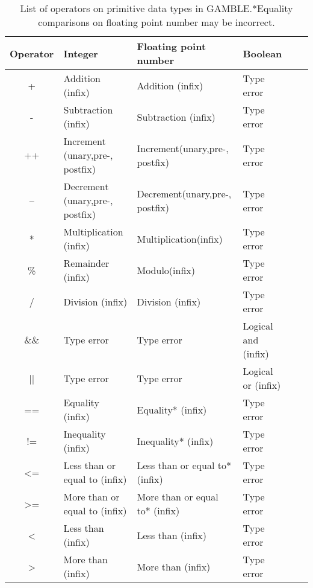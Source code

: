 \begin{table}[h]
    \centering
    \begin{tabular}{|c|l|l|l|l|l|}
    \hline
    \textbf{Operator}  & \textbf{Integer}                   & \textbf{Floating point number}    & \textbf{Boolean}       \\ \hline
    +                  & Addition (infix)                   & Addition (infix)                  & Type error             \\ \hline 
    -                  & Subtraction (infix)                & Subtraction (infix)               & Type error             \\ \hline 
    ++                 & Increment (unary,pre-, postfix)    & Increment(unary,pre-, postfix)    & Type error             \\ \hline    
    --                 & Decrement (unary,pre-, postfix)    & Decrement(unary,pre-, postfix)    & Type error             \\ \hline
    *                  & Multiplication (infix)             & Multiplication(infix)             & Type error             \\ \hline
    \%                 & Remainder (infix)                  & Modulo(infix)                     & Type error             \\ \hline
    /                  & Division (infix)                   & Division (infix)                  & Type error             \\ \hline
    \&\&               & Type error                         & Type error                        & Logical and (infix)    \\ \hline 
    ||                 & Type error                         & Type error                        & Logical or (infix)     \\ \hline 
    ==                 & Equality (infix)                   & Equality* (infix)                 & Type error             \\ \hline 
    !=                 & Inequality (infix)                 & Inequality* (infix)               & Type error             \\ \hline
    <=                 & Less than or equal to (infix)      & Less than or equal to* (infix)    & Type error             \\ \hline
    >=                 & More than or equal to (infix)      & More than or equal to* (infix)    & Type error             \\ \hline
    <                  & Less than (infix)                  & Less than (infix)                 & Type error             \\ \hline
    >                  & More than (infix)                  & More than (infix)                 & Type error             \\ \hline
    \end{tabular}
    \caption[List of operators on primitive data types in GAMBLE.]{List of operators on primitive data types in GAMBLE.\@*Equality comparisons on floating point number may be incorrect.}\label{tbl:operators}
\end{table}
